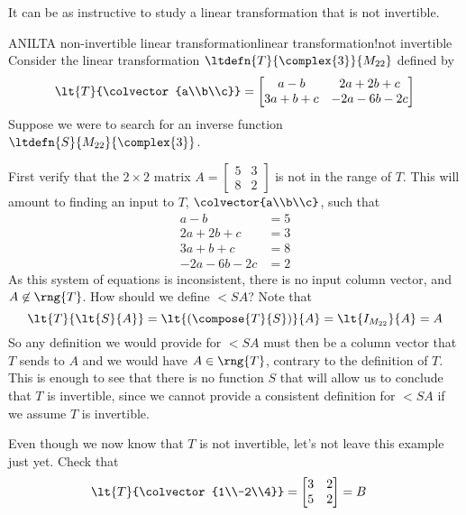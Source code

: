 %
It can be as instructive to study a linear transformation that is not invertible.
%
\begin{example}{ANILT}{A non-invertible linear transformation}{linear transformation!not invertible}
Consider the linear transformation $\ltdefn{T}{\complex{3}}{M_{22}}$ defined by
%
\begin{equation*}
\lt{T}{\colvector{a\\b\\c}}=\begin{bmatrix}
a-b&2a+2b+c\\3a+b+c&-2a-6b-2c
\end{bmatrix}
\end{equation*}
%
Suppose we were to search for an inverse function $\ltdefn{S}{M_{22}}{\complex{3}}$.\par
%
First verify that the $2\times 2$ matrix
$A=\begin{bmatrix}
5&3\\8&2
\end{bmatrix}
$
is not in the range of $T$.  This will amount to finding an input to $T$, $\colvector{a\\b\\c}$, such that
%
\begin{align*}
a-b&=5\\
2a+2b+c&=3\\
3a+b+c&=8\\
-2a-6b-2c&=2
\end{align*}
%
As this system of equations is inconsistent, there is no input column vector, and $A\not\in\rng{T}$.  How should we define $\lt{S}{A}$?  Note that
%
\begin{equation*}
\lt{T}{\lt{S}{A}}=\lt{\left(\compose{T}{S}\right)}{A}=
\lt{I_{M_{22}}}{A}=A
\end{equation*}
%
So any definition we would provide for $\lt{S}{A}$ must then be a column vector that $T$ sends to $A$ and we would have $A\in\rng{T}$, contrary to the definition of $T$.  This is enough to see that there is no function $S$ that will allow us to conclude that $T$ is invertible, since we cannot provide a consistent definition for $\lt{S}{A}$ if we assume $T$ is invertible.\par
%
Even though we now know that $T$ is not invertible, let's not leave this example just yet.  Check that
%
\begin{align*}
\lt{T}{\colvector{1\\-2\\4}}&=\begin{bmatrix}3&2\\5&2\end{bmatrix}=B&

\end{align*}
\end{example}
